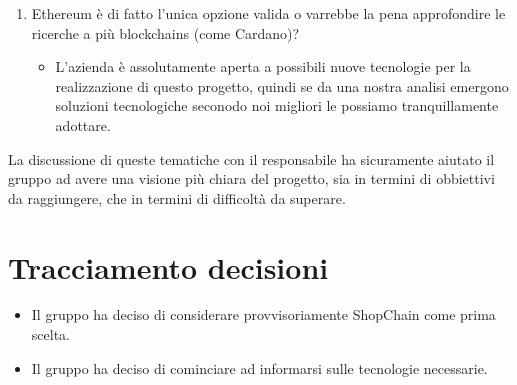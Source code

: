 \begin{enumerate}
            \begin{itemize}
                \item L'utente viene identificato unicamente dall'address del suo wallet, sia dal punto di vista dell'acquirente che dal punto di vista del venditore. Non avremo bisogno di
                      mantenere traccia di altre informazioni, quali: nomi, cognomi, anno di nascita ecc per due motivazioni:
                      \begin{itemize}
                          \item \'E sicuramente un costo in più, visto che si andrebbero ad aggiungere dati nella blockchain.
                          \item Utenti esterni potrebbero entrare nella blockchain e leggere i dati personali di altri utenti, facendo venire a meno il fattore di anonimità caratteristico delle blockchains
                      \end{itemize}
            \end{itemize}
    \item Ethereum è di fatto l'unica opzione valida o varrebbe la pena approfondire le ricerche a più blockchains (come Cardano)?
            \begin{itemize}
                \item L'azienda è assolutamente aperta a possibili nuove tecnologie per la realizzazione di questo progetto, quindi se da una nostra analisi emergono soluzioni tecnologiche seconodo noi migliori
                      le possiamo tranquillamente adottare.
            \end{itemize}
\end{enumerate}
La discussione di queste tematiche con il responsabile ha sicuramente aiutato il gruppo ad avere una visione più chiara del progetto,
sia in termini di obbiettivi da raggiungere, che in termini di difficoltà da superare.
\section{Tracciamento decisioni}
\begin{itemize}
    \item Il gruppo ha deciso di considerare provvisoriamente ShopChain come prima scelta.
    \item Il gruppo ha deciso di cominciare ad informarsi sulle tecnologie necessarie.
\end{itemize}